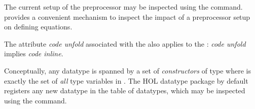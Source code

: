 \begin{isabellebody}
\begin{isamarkuptext}
  \noindent The current setup of the preprocessor may be inspected using
  the \hyperlink{command.print-codesetup}{\mbox{}} command.
  \hyperlink{command.code-thms}{\mbox{}} provides a convenient
  mechanism to inspect the impact of a preprocessor setup
  on defining equations.

  \begin{warn}
    The attribute \emph{code unfold}
    associated with the  also applies to
    the :
    \emph{code unfold} implies \emph{code inline}.
  \end{warn}%
\end{isamarkuptext}%
\isamarkuptrue%
%
\isamarkuptrue%
%
\begin{isamarkuptext}%
Conceptually, any datatype is spanned by a set of
  \emph{constructors} of type 
  where  is exactly the set of \emph{all}
  type variables in \isa{{\isasymtau}}.  The HOL datatype package
  by default registers any new datatype in the table
  of datatypes, which may be inspected using
  the \hyperlink{command.print-codesetup}{\mbox{}} command.


\end{isamarkuptext}
\end{isabellebody}
